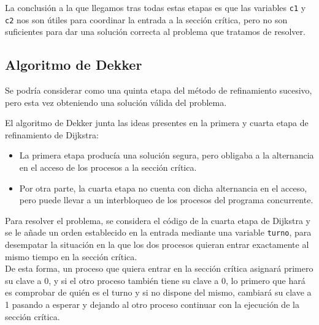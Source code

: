 La conclusión a la que llegamos tras todas estas etapas es que las variables \verb|c1| y \verb|c2| nos son útiles para coordinar la entrada a la sección crítica, pero no son suficientes para dar una solución correcta al problema que tratamos de resolver.\\

\subsection{Algoritmo de Dekker}
Se podría considerar como una quinta etapa del método de refinamiento sucesivo, pero esta vez obteniendo una solución válida del problema.

El algoritmo de Dekker junta las ideas presentes en la primera y cuarta etapa de refinamiento de Dijkstra:
\begin{itemize}
    \item La primera etapa producía una solución segura, pero obligaba a la alternancia en el acceso de los procesos a la sección crítica.
    \item Por otra parte, la cuarta etapa no cuenta con dicha alternancia en el acceso, pero puede llevar a un interbloqueo de los procesos del programa concurrente.
\end{itemize}
Para resolver el problema, se considera el código de la cuarta etapa de Dijkstra y se le añade un orden establecido en la entrada mediante una variable \verb|turno|, para desempatar la situación en la que los dos procesos quieran entrar exactamente al mismo tiempo en la sección crítica.\\

De esta forma, un proceso que quiera entrar en la sección crítica asignará primero su clave a 0, y si el otro proceso también tiene su clave a 0, lo primero que hará es comprobar de quién es el turno y si no dispone del mismo, cambiará su clave a 1 pasando a esperar y dejando al otro proceso continuar con la ejecución de la sección crítica.

